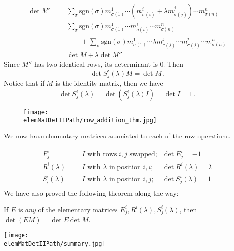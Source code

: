 \begin{eqnarray*}
\det M' & = & \sum_{\sigma} \text{sgn}(\sigma) m^1_{\sigma(1)}\cdots (m^i_{\sigma(i)}+ \lambda m^j_{\sigma(j)}) \cdots m^n_{\sigma(n)} \\
& = & \sum_{\sigma} \text{sgn}(\sigma) m^1_{\sigma(1)}\cdots m^i_{\sigma(i)} \cdots m^n_{\sigma(n)} \\
&   & \qquad + \sum_{\sigma} \text{sgn}(\sigma) m^1_{\sigma(1)}\cdots \lambda m^j_{\sigma(j)} \cdots m^j_{\sigma(j)} \cdots m^n_{\sigma(n)} \\
& = & \det M + \lambda \det M''
\end{eqnarray*}
Since $M''$ has two identical rows, its determinant is $0$.  Then \[\det S^i_j(\lambda)M = \det M\, .\]
Notice that if $M$ is the identity matrix, then we have \[\det S^i_j(\lambda) = \det (S^i_j(\lambda)I) = \det I = 1\, .\]

\begin{figure}
\begin{center}
\texttt{[image: \\elemMatDetIIPath/row\_addition\_thm.jpg]}
\end{center}
\end{figure}

We now have elementary matrices associated to each of the row operations.

\[
\begin{array}{cccc}
E^i_j &=& I \text{ with rows $i,j$ swapped;} &\det E^i_j=-1 \\[3mm]
R^i(\lambda) &=& I \text{ with $\lambda$ in position $i,i$;} 
	&\det R^i(\lambda)=\lambda \\[3mm]
S^i_j(\lambda) &=& I \text{ with $\lambda$ in position $i,j$;} 
	&\det S^i_j(\lambda)=1 \\[3mm]
\end{array}
\]
We have also proved the following theorem along the way:

\begin{theorem}
If $E$ is \emph{any} of the elementary matrices $E^i_j, R^i(\lambda), S^i_j(\lambda)$, then $\det(EM)=\det E \det M$.
\end{theorem}



\begin{center}
\hspace{3mm}\texttt{[image: \\elemMatDetIIPath/summary.jpg]}
\end{center}


